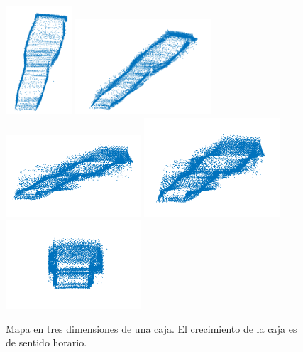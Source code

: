 \begin{figure}
  \centering \footnotesize
  \includegraphics[width=0.22\textwidth]{images/3DMOV_2.png}
  \includegraphics[width=0.45\textwidth]{images/3DMOV_3.png}
  \includegraphics[width=0.45\textwidth]{images/3DMOV_6.png}
  \includegraphics[width=0.45\textwidth]{images/3DMOV_7.png}
  \includegraphics[width=0.45\textwidth]{images/3DMOV_8.png}
  \captionsetup{font=footnotesize}
  \caption{Mapa en tres dimensiones de una caja. El crecimiento de la caja es de sentido horario.}
  \label{fig:tunel2013D}
\end{figure}
